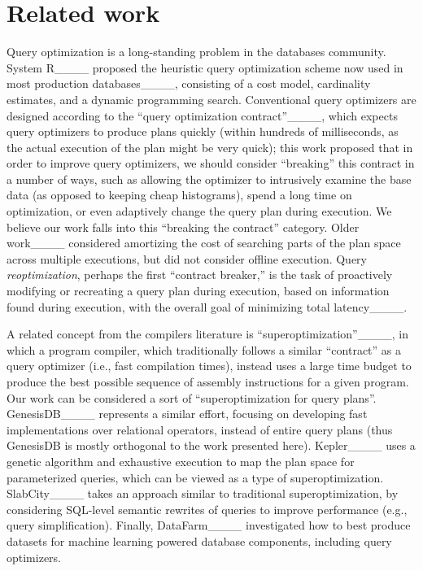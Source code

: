\section{Related work}
Query optimization is a long-standing problem in the databases community. System R____ proposed the heuristic query optimization scheme now used in most production databases____, consisting of a cost model, cardinality estimates, and a dynamic programming search.
Conventional query optimizers are designed according to the ``query optimization contract''____, which expects query optimizers to produce plans quickly (within hundreds of milliseconds, as the actual execution of the plan might be very quick); this work proposed that in order to improve query optimizers, we should consider ``breaking'' this contract in a number of ways, such as allowing the optimizer to intrusively examine the base data (as opposed to keeping cheap histograms), spend a long time on optimization, or even adaptively change the query plan during execution. We believe our work falls into this ``breaking the contract'' category. Older work____ considered amortizing the cost of searching parts of the plan space across multiple executions, but did not consider offline execution. Query \emph{reoptimization}, perhaps the first ``contract breaker,'' is the task of proactively modifying or recreating a query plan during execution, based on information found during execution, with the overall goal of minimizing total latency____.


A related concept from the compilers literature is ``superoptimization''____, in which a program compiler, which traditionally follows a similar ``contract'' as a query optimizer (i.e., fast compilation times), instead uses a large time budget to produce the best possible sequence of assembly instructions for a given program. Our work can be considered a sort of ``superoptimization for query plans''. GenesisDB____ represents a similar effort, focusing on developing fast implementations over relational operators, instead of entire query plans (thus GenesisDB is mostly orthogonal to the work presented here). Kepler____ uses a genetic algorithm and exhaustive execution to map the plan space for parameterized queries, which can be viewed as a type of superoptimization. SlabCity____ takes an approach similar to traditional superoptimization, by considering SQL-level semantic rewrites of queries to improve performance (e.g., query simplification). Finally, DataFarm____  investigated how to best produce datasets for machine learning powered database components, including query optimizers.

